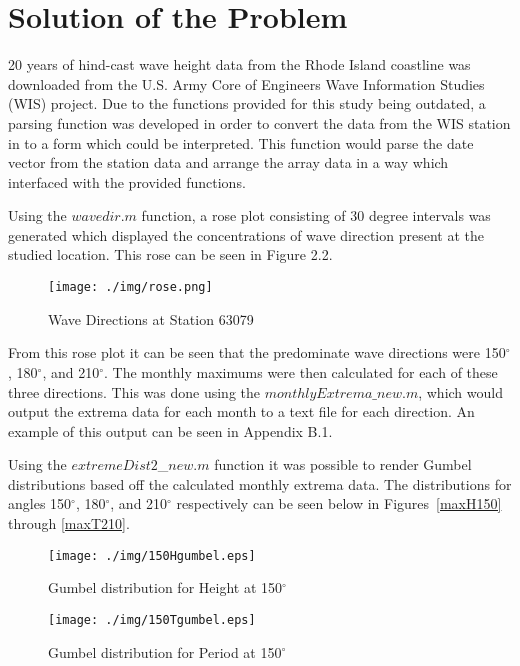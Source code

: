 \section{Solution of the Problem}

20 years of hind-cast wave height data from the Rhode Island coastline was downloaded from the U.S. Army Core of Engineers Wave Information Studies (WIS) project. Due to the functions provided for this study being outdated, a parsing function was developed in order to convert the data from the WIS station in to a form which could be interpreted. This function would parse the date vector from the station data and arrange the array data in a way which interfaced with the provided functions.

Using the $wavedir.m$ function, a rose plot consisting of 30 degree intervals was generated which displayed the concentrations of wave direction present at the studied location. This rose can be seen in Figure 2.2.

\begin{figure}[H]
	\centering
	\texttt{[image: ./img/rose.png]}
	\label{wisdir}
	\caption{Wave Directions at Station 63079}
\end{figure}

From this rose plot it can be seen that the predominate wave directions were 150$^{\circ}$, 180$^{\circ}$, and 210$^{\circ}$. The monthly maximums were then calculated for each of these three directions. This was done using the $monthlyExtrema\_new.m$, which would output the extrema data for each month to a text file for each direction. An example of this output can be seen in Appendix B.1. 

Using the $extremeDist2$\_$new.m$ function it was possible to render Gumbel distributions based off the calculated monthly extrema data. The distributions for angles 150$^{\circ}$, 180$^{\circ}$, and 210$^{\circ}$ respectively can be seen below in Figures~\ref{maxH150} through \ref{maxT210}.

\begin{figure}[H]
\centering
\begin{minipage}{0.49\textwidth}
	\texttt{[image: ./img/150Hgumbel.eps]}
	\caption{Gumbel distribution for Height at 150$^\circ$}
	\label{maxH150}
\end{minipage}
\begin{minipage}{0.49\textwidth}
	\texttt{[image: ./img/150Tgumbel.eps]}
	\caption{Gumbel distribution for Period at 150$^\circ$}
	\label{maxT150}
\end{minipage}
\end{figure}

